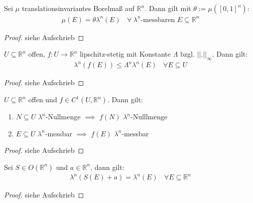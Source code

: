 \documentclass[11pt,a4paper,fleqn,openany]{report}
\begin{document}
    \begin{theorem}
      Sei $\mu$ translationsinvariantes Borelmaß auf $\mathbb{R}^n$. Dann gilt mit $\theta := \mu([0,1]^n)$:
      \begin{align*}
        \mu(E) = \theta \lambda^n(E) \ \ \ \ \forall \ \lambda^n \text{-messbaren } E \subseteq \mathbb{R}^n
      \end{align*}
    \end{theorem}

    \begin{proof}
      siehe Aufschrieb
    \end{proof}

    \begin{lemma}
      $U \subseteq \mathbb{R}^n$ offen, $f: U \to \mathbb{R}^n$ lipschitz-stetig mit Konstante $\Lambda$ bzgl. $||.||_{\infty}$. Dann gilt:
      \begin{align*}
        \lambda^n(f(E)) \leq \Lambda^n \lambda^n(E) \ \ \ \ \forall E \subseteq U
      \end{align*}
    \end{lemma}

    \begin{proof}
      siehe Aufschrieb
    \end{proof}

    \begin{theorem}
      $U \subseteq \mathbb{R}^n$ offen und $f \in C^1(U, \mathbb{R}^n)$. Dann gilt:
      \begin{enumerate}
        \item $N \subseteq U$ $\lambda^n$-Nullmenge $\implies$ $f(N)$ $\lambda^n$-Nulllmenge
        \item $E \subseteq U$ $\lambda^n$-messbar $\implies$ $f(E)$ $\lambda^n$-messbar
      \end{enumerate}
    \end{theorem}

    \begin{proof}
      siehe Aufschrieb
    \end{proof}

    \begin{theorem}
      Sei $S \in O(\mathbb{R}^n)$ und $a \in \mathbb{R}^n$, dann gilt:
      \begin{align*}
        \lambda^n(S(E) + a) = \lambda^n(E) \ \ \ \ \forall E \subseteq \mathbb{R}^n
      \end{align*}
    \end{theorem}

    \begin{proof}
      siehe Aufschrieb
    \end{proof}
\end{document}
